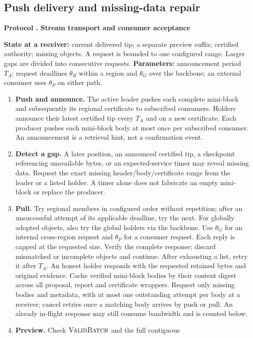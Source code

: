 \documentclass[11pt,a4paper,onecolumn]{article}
\newcommand{\Proc}[1]{\textnormal{\textsc{#1}}}
\theoremstyle{remark}\newtheorem{example}[definition]{Example}
\newcounter{protocol}
\newenvironment{protocol}[2]{\refstepcounter{protocol}\label{#1}\begin{mdframed}[nobreak=true,linewidth=.6pt,skipabove=10pt,skipbelow=10pt,innertopmargin=8pt,innerbottommargin=8pt]\small\raggedright\noindent\textbf{Protocol \theprotocol. #2}\par\smallskip}{\end{mdframed}}
\begin{document}
\subsection{Push delivery and missing-data repair}\label{sec:pull}
\begin{protocol}{alg:pull}{Stream transport and consumer acceptance}
\textbf{State at a receiver:} current delivered tip; a separate preview suffix;
certified authority; missing objects. A request is bounded to one configured
range. Larger gaps are divided into consecutive requests.
\textbf{Parameters:} announcement period $T_A$; request deadlines $\theta_R$
within a region and $\theta_G$ over the backbone; an external consumer uses
$\theta_P$ on either path.
\begin{enumerate}[label=\textbf{D\arabic*.}]
\item \textbf{Push and announce.} The active leader pushes each complete
mini-block and subsequently its regional certificate to subscribed consumers.
Holders announce their latest certified tip every $T_A$ and on a new certificate.
Each producer pushes each mini-block body at most once per subscribed consumer.
An announcement is a retrieval hint, not a confirmation event.
\item \textbf{Detect a gap.} A later position, an announced certified tip,
a checkpoint referencing unavailable bytes, or an expected-service timer may
reveal missing data. Request the exact missing header/body/certificate range
from the leader or a listed holder. A timer alone does not fabricate an empty
mini-block or replace the producer.
\item \textbf{Pull.} Try regional members in configured order without repetition;
after an unsuccessful attempt of its applicable deadline, try the next. For globally adopted
objects, also try the global holders via the backbone. Use $\theta_G$ for an
internal cross-region request and $\theta_P$ for a consumer request.
Each reply is capped at the requested size. Verify the complete response;
discard mismatched or incomplete objects and continue. After exhausting a list,
retry it after $T_A$. An honest holder responds with the requested retained
bytes and original evidence. Cache verified mini-block bodies by their content
digest across all proposal, report and certificate wrappers. Request only
missing bodies and metadata, with at most one outstanding attempt per body
at a receiver; cancel retries once a matching body arrives by push or pull.
An already in-flight response may still consume bandwidth and is counted below.
\item \textbf{Preview.} Check $\Proc{ValidBatch}$ and the full contiguous

\end{enumerate}
\end{protocol}
\end{document}
